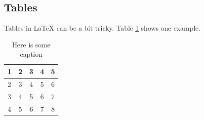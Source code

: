 \subsection{Tables}

\noindent Tables in LaTeX can be a bit tricky.  Table \ref{tab:table1} shows one example.

\begin{table}
\centering
\caption{Here is some caption}
\label{tab:table1}
\begin{tabular}{c|cccc}
1 & 2 & 3 & 4 & 5 \\
\hline
2 & 3 & 4 & 5 & 6 \\
3 & 4 & 5 & 6 & 7 \\
4 & 5 & 6 & 7 & 8
\end{tabular}
\end{table}



